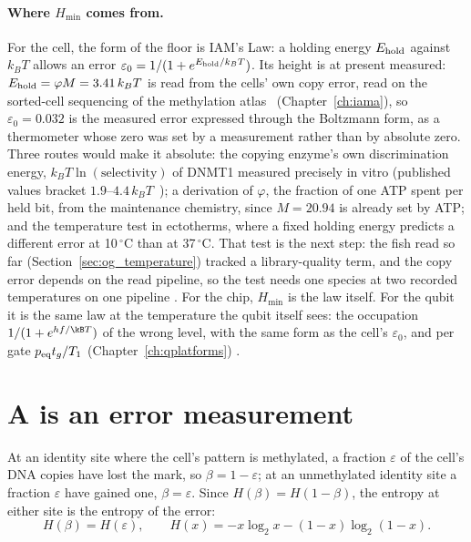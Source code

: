 \paragraph{Where $H_{\min}$ comes from.} For the cell, the form of the floor is IAM's Law: a holding energy $E_{\rm hold}$ against $k_BT$ allows
an error $\varepsilon_0=1/(1+e^{E_{\rm hold}/k_BT})$. Its height is at present measured: $E_{\rm hold}=\varphi M=3.41\,k_BT$ is read from the cells' own
copy error, read on the sorted-cell sequencing of the methylation atlas~\cite{Loyfer2023} (Chapter~\ref{ch:iama}), so $\varepsilon_0=0.032$ is the measured error expressed through the Boltzmann form, as a thermometer whose zero was set by a measurement
rather than by absolute zero. Three routes would make it absolute: the copying enzyme's own discrimination energy, $k_BT\ln(\text{selectivity})$ of
DNMT1 measured precisely in vitro (published values bracket $1.9$--$4.4\,k_BT$~\cite{Pradhan1999,Goyal2006,Adam2023}); a derivation of $\varphi$, the fraction of one ATP spent per held bit,
from the maintenance chemistry, since $M=20.94$ is already set by ATP; and the temperature test in ectotherms, where a fixed holding energy predicts a
different error at 10\,$^\circ$C than at 37\,$^\circ$C. That test is the next step: the fish read so far (Section~\ref{sec:og_temperature})
tracked a library-quality term, and the copy error depends on the read pipeline, so the test needs one species at two recorded temperatures on one
pipeline \openprob. For the
chip, $H_{\min}$ is the law itself. For the qubit it is the same law at the temperature the qubit itself sees: the occupation
$1/(1+e^{hf/\kB T})$ of the wrong level, with the same form as the cell's $\varepsilon_0$, and per gate $p_{\rm eq}t_g/T_1$
(Chapter~\ref{ch:qplatforms}) \derived.

\section{A is an error measurement}
At an identity site where the cell's pattern is methylated, a fraction $\varepsilon$ of the cell's DNA copies have lost the mark, so
$\beta=1-\varepsilon$; at an unmethylated identity site a fraction $\varepsilon$ have gained one, $\beta=\varepsilon$. Since
$H(\beta)=H(1-\beta)$, the entropy at either site is the entropy of the error:
\begin{equation}H(\beta)=H(\varepsilon),\qquad H(x)=-x\log_2x-(1-x)\log_2(1-x).\end{equation}
\derived
